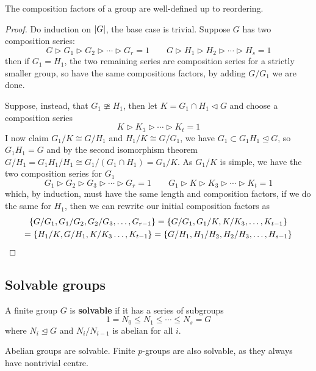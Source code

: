 \documentclass{article}
\begin{document}
\begin{theorem}
    The composition factors of a group are well-defined up to reordering.
    \begin{proof}
        Do induction on $\left| G \right|$, the base case is trivial. Suppose $G$ has two composition series: \[
        G \rhd G_1 \rhd G_2 \rhd \cdots \rhd G_r = 1 \qquad G \rhd H_1 \rhd H_2 \rhd \cdots \rhd H_s = 1
        \] then if $G_1=H_1$, the two remaining series are composition series for a strictly smaller group, so have the same compositions factors, by adding $G/G_1$ we are done.

        Suppose, instead, that $G_1\ncong H_1$, then let $K = G_1\cap H_1\lhd G$ and choose a composition series \[
        K \rhd K_3 \rhd \cdots \rhd K_t = 1
        \] I now claim $G_1/K\cong G/H_1$ and $H_1/K\cong G/G_1$, we have $G_1\subset G_1H_1\unlhd G$, so $G_1H_1 = G$ and by the second isomorphism theorem $G/H_1 = G_1H_1/H_1\cong G_1 / (G_1\cap H_1) = G_1/K$. As $G_1/K$ is simple, we have the two composition series for $G_1$ \[
        G_1 \rhd G_2 \rhd G_3 \rhd \cdots \rhd G_r = 1 \qquad G_1 \rhd K \rhd K_3 \rhd \cdots \rhd K_t = 1
        \] which, by induction, must have the same length and composition factors, if we do the same for $H_1$, then we can rewrite our initial composition factors as \begin{gather*}
            \{G/G_1,G_1/G_2,G_2/G_3,\ldots,G_{r-1}\} = \{G/G_1,G_1/K,K/K_3,\ldots, K_{t-1}\} \\ 
            = \{H_1/K,G/H_1,K/K_3\ldots, K_{t-1}\} = \{G/H_1,H_1/H_2,H_2/H_3,\ldots, H_{s-1}\}\qedhere
        \end{gather*}
    \end{proof}
\end{theorem}

\newpage

\subsection{Solvable groups}

\begin{definition}
    A finite group $G$ is \textbf{solvable} if it has a series of subgroups \[
    1 = N_0 \leq N_1 \leq \cdots \leq N_s = G
    \] where $N_i\unlhd G$ and $N_i/N_{i-1}$ is abelian for all $i$.
\end{definition}

Abelian groups are solvable. Finite $p$-groups are also solvable, as they always have nontrivial centre.
\end{document}
